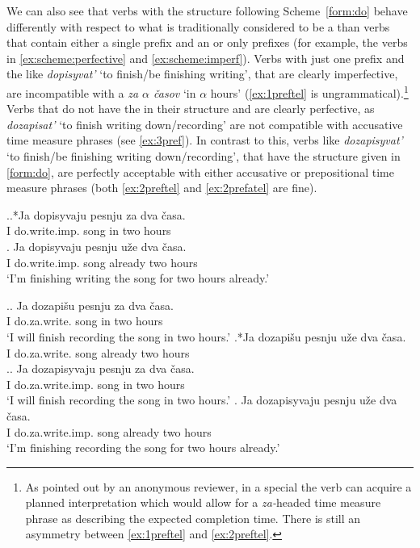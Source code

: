 We can also see that verbs with the structure following Scheme~\ref{form:do} behave differently with respect to what is traditionally considered to be a  than verbs that contain either a single prefix and an  or only prefixes (for example, the verbs in \ref{ex:scheme:perfective} and \ref{ex:scheme:imperf}). Verbs with just one prefix and the  like \textit{dopisyvat'} `to finish/be finishing writing', that are clearly imperfective, are incompatible with a  \textit{za $\alpha$ \v{c}asov} `in $\alpha$ hours' (\ref{ex:1preftel} is ungrammatical).\footnote{As pointed out by an anonymous reviewer, in a special  the verb can acquire a planned  interpretation which would allow for a \textit{za-}headed time measure phrase as describing the expected completion time. There is still an asymmetry between \ref{ex:1preftel} and \ref{ex:2preftel}.} Verbs that do not have the  in their structure and are clearly perfective, as \textit{dozapisat'} `to finish writing down/recording' are not compatible with accusative time measure phrases (see \ref{ex:3pref}). In contrast to this, verbs like \textit{dozapisyvat'} `to finish/be finishing writing down/recording', that have the structure given in \ref{form:do}, are perfectly acceptable with either accusative or prepositional time measure phrases (both \ref{ex:2preftel} and \ref{ex:2prefatel} are fine).

\ex.\label{ex:1pref}\ag.*Ja dopisyvaju pesnju za dva \v{c}asa.\label{ex:1preftel}\\
I do.write.imp. song in two hours\\
\bg. \label{ex:1prefatel}Ja dopisyvaju pesnju u\v{z}e dva \v{c}asa.\\
I do.write.imp. song already two hours\\
\trans `I'm finishing writing the song for two hours already.'

\ex.\label{ex:3pref}\ag. \label{ex:3preftel}Ja dozapi\v{s}u pesnju za dva \v{c}asa.\\
I do.za.write. song in two hours\\
\trans `I will finish recording the song in two hours.'
\bg.*Ja dozapi\v{s}u pesnju u\v{z}e dva \v{c}asa.\label{ex:3prefatel}\\
I do.za.write. song already two hours\\

\ex.\label{ex:2pref}\ag. \label{ex:2preftel}Ja dozapisyvaju pesnju za dva \v{c}asa.\\
I do.za.write.imp. song in two hours\\
\trans `I will finish recording the song in two hours.'
\bg. \label{ex:2prefatel}Ja dozapisyvaju pesnju u\v{z}e dva \v{c}asa.\\
I do.za.write.imp. song already two hours\\
\trans `I'm finishing recording the song for two hours already.'

